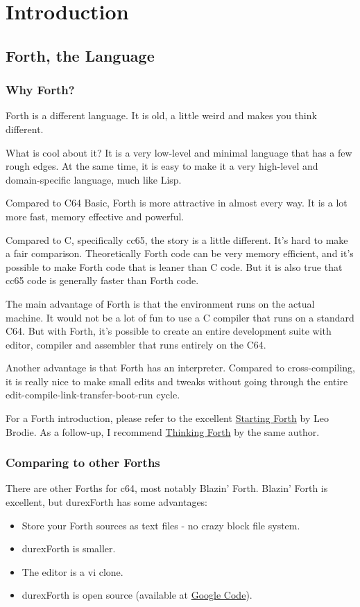 \chapter{Introduction}

\section{Forth, the Language}

\subsection{Why Forth?}

Forth is a different language. It is old, a little weird and makes you think different.

What is cool about it? It is a very low-level and minimal language that has a few rough edges. At the same time, it is easy to make it a very high-level and domain-specific language, much like Lisp. 

Compared to C64 Basic, Forth is more attractive in almost every way. It is a lot more fast, memory effective and powerful.

Compared to C, specifically cc65, the story is a little different. It's hard to make a fair comparison. Theoretically Forth code can be very memory efficient, and it's possible to make Forth code that is leaner than C code. But it is also true that cc65 code is generally faster than Forth code.

The main advantage of Forth is that the environment runs on the actual machine. It would not be a
lot of fun to use a C compiler that runs on a standard C64. But with Forth, it's possible to create an entire development suite with editor, compiler and assembler that runs entirely on the C64.

Another advantage is that Forth has an interpreter. Compared to cross-compiling, it is really nice
to make small edits and tweaks without going through the entire edit-compile-link-transfer-boot-run cycle.

For a Forth introduction, please refer to the excellent
\href{http://www.forth.com/starting-forth/}{Starting Forth} by Leo Brodie. As a follow-up, I
recommend \href{http://thinking-forth.sourceforge.net/}{Thinking Forth} by the same author.

\subsection{Comparing to other Forths}

There are other Forths for c64, most notably Blazin' Forth. Blazin' Forth is excellent, but durexForth has some advantages:

\begin{itemize}
\item Store your Forth sources as text files - no crazy block file system.
\item durexForth is smaller.
\item The editor is a vi clone.
\item durexForth is open source (available at \href{http://code.google.com/p/durexforth/}{Google Code}).
\end{itemize}
